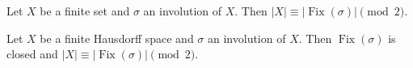 \begin{proposition}\label{Calloway14-prop-3.3}
\label{Calloway14-prop:parity}
Let $X$ be a finite set and $\sigma$ an involution of $X$. Then $|X| \equiv |\operatorname{Fix}(\sigma)| \pmod 2$.
\end{proposition}

\begin{theorem}\label{Calloway14-thm-3.4}
\label{Calloway14-thm:both}
Let $X$ be a finite Hausdorff space and $\sigma$ an involution of $X$. Then $\operatorname{Fix}(\sigma)$ is closed and $|X| \equiv |\operatorname{Fix}(\sigma)| \pmod 2$.
\end{theorem}
